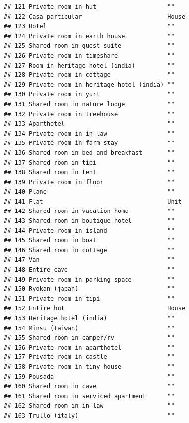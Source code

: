 \documentclass[]{article}
\begin{document}
\begin{verbatim}
## 121 Private room in hut                    ""               
## 122 Casa particular                        House            
## 123 Hotel                                  ""               
## 124 Private room in earth house            ""               
## 125 Shared room in guest suite             ""               
## 126 Private room in timeshare              ""               
## 127 Room in heritage hotel (india)         ""               
## 128 Private room in cottage                ""               
## 129 Private room in heritage hotel (india) ""               
## 130 Private room in yurt                   ""               
## 131 Shared room in nature lodge            ""               
## 132 Private room in treehouse              ""               
## 133 Aparthotel                             ""               
## 134 Private room in in-law                 ""               
## 135 Private room in farm stay              ""               
## 136 Shared room in bed and breakfast       ""               
## 137 Shared room in tipi                    ""               
## 138 Shared room in tent                    ""               
## 139 Private room in floor                  ""               
## 140 Plane                                  ""               
## 141 Flat                                   Unit             
## 142 Shared room in vacation home           ""               
## 143 Shared room in boutique hotel          ""               
## 144 Private room in island                 ""               
## 145 Shared room in boat                    ""               
## 146 Shared room in cottage                 ""               
## 147 Van                                    ""               
## 148 Entire cave                            ""               
## 149 Private room in parking space          ""               
## 150 Ryokan (japan)                         ""               
## 151 Private room in tipi                   ""               
## 152 Entire hut                             House            
## 153 Heritage hotel (india)                 ""               
## 154 Minsu (taiwan)                         ""               
## 155 Shared room in camper/rv               ""               
## 156 Private room in aparthotel             ""               
## 157 Private room in castle                 ""               
## 158 Private room in tiny house             ""               
## 159 Pousada                                ""               
## 160 Shared room in cave                    ""               
## 161 Shared room in serviced apartment      ""               
## 162 Shared room in in-law                  ""               
## 163 Trullo (italy)                         ""
\end{verbatim}
\end{document}
